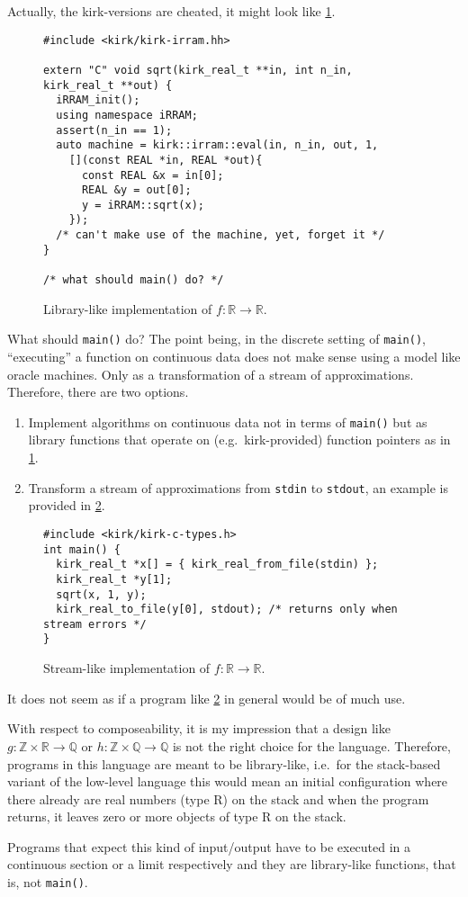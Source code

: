 \documentclass[a4paper,parskip=half]{scrartcl}
\begin{document}
Actually, the kirk-versions are cheated, it might look like \cref{fig:kirk-lib}.
\begin{figure}[H]
\begin{verbatim}
#include <kirk/kirk-irram.hh>

extern "C" void sqrt(kirk_real_t **in, int n_in, kirk_real_t **out) {
  iRRAM_init();
  using namespace iRRAM;
  assert(n_in == 1);
  auto machine = kirk::irram::eval(in, n_in, out, 1,
    [](const REAL *in, REAL *out){
      const REAL &x = in[0];
      REAL &y = out[0];
      y = iRRAM::sqrt(x);
    });
  /* can't make use of the machine, yet, forget it */
}

/* what should main() do? */
\end{verbatim}
\caption{Library-like implementation of $f:\mathbb R\to\mathbb R$.}
\label{fig:kirk-lib}
\end{figure}

What should \verb!main()! do? The point being, in the discrete setting of
\verb!main()!, ``executing'' a function on continuous data does not make sense
using a model like oracle machines. Only as a transformation of a stream of
approximations. Therefore, there are two options.
\begin{enumerate}
\item
	Implement algorithms on continuous data not in terms of \verb!main()!
	but as library functions that operate on (e.g.\ kirk-provided) function
	pointers as in \cref{fig:kirk-lib}.
\item
	Transform a stream of approximations from \verb!stdin! to \verb!stdout!,
	an example is provided in \cref{fig:stream}.
\end{enumerate}

\begin{figure}[H]
\begin{verbatim}
#include <kirk/kirk-c-types.h>
int main() {
  kirk_real_t *x[] = { kirk_real_from_file(stdin) };
  kirk_real_t *y[1];
  sqrt(x, 1, y);
  kirk_real_to_file(y[0], stdout); /* returns only when stream errors */
}
\end{verbatim}
\caption{Stream-like implementation of $f:\mathbb R\to\mathbb R$.}
\label{fig:stream}
\end{figure}

It does not seem as if a program like \cref{fig:stream} in general would be of
much use.

With respect to composeability, it is my impression that a design like
$g:\mathbb Z\times\mathbb R\to\mathbb Q$ or
$h:\mathbb Z\times\mathbb Q\to\mathbb Q$ is not the right choice for the
language. Therefore, programs in this language are meant to be library-like,
i.e.\ for the stack-based variant of the low-level language this would mean
an initial configuration where there already are real numbers (type R) on the
stack and when the program returns, it leaves zero or more objects of type R on
the stack.

Programs that expect this kind of input/output have to be executed in a
continuous section or a limit respectively and they are library-like functions,
that is, not \verb!main()!.
\end{document}

